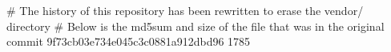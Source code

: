 # The history of this repository has been rewritten to erase the vendor/ directory
# Below is the md5sum and size of the file that was in the original commit
9f73cb03e734e045c3c0881a912dbd96
1785
